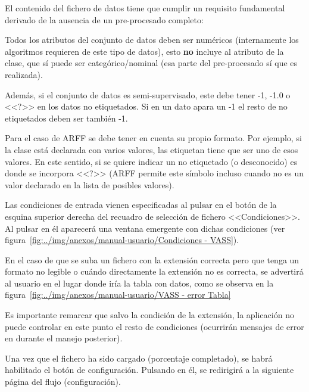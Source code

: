 El contenido del fichero de datos tiene que cumplir un requisito fundamental
derivado de la ausencia de un pre-procesado completo: 

\begin{tcolorbox}[colback=red!5!white,colframe=red!75!black,fontupper=\footnotesize,title=Requisito fundamental]
	Todos los atributos del conjunto de datos deben ser numéricos (internamente los
	algoritmos requieren de este tipo de datos), esto \textbf{no} incluye al
	atributo de la clase, que sí puede ser categórico/nominal (esa parte del
	pre-procesado sí que es realizada).
\end{tcolorbox}

Además, si el conjunto de datos es semi-supervisado, este debe tener -1, -1.0 o
<<?>> en los datos no etiquetados. Si en un dato apara un -1 el resto de no
etiquetados deben ser también -1.

Para el caso de ARFF se debe tener en cuenta su propio formato. Por ejemplo, si
la clase está declarada con varios valores, las etiquetan tiene que ser uno de
esos valores. En este sentido, si se quiere indicar un no etiquetado (o
desconocido) es donde se incorpora <<?>> (ARFF permite este símbolo incluso
cuando no es un valor declarado en la lista de posibles valores).

Las condiciones de entrada vienen especificadas al pulsar en el botón de la
esquina superior derecha del recuadro de selección de fichero <<Condiciones>>.
Al pulsar en él aparecerá una ventana emergente con dichas condiciones (ver
figura~\ref{fig:../img/anexos/manual-usuario/Condiciones - VASS}).


En el caso de que se suba un fichero con la extensión correcta pero que tenga un formato no legible o cuándo directamente la extensión no es correcta, se advertirá al usuario en el lugar donde iría la tabla con datos, como se observa en la figura~\ref{fig:../img/anexos/manual-usuario/VASS - error Tabla}


Es importante remarcar que salvo la condición de la extensión, la aplicación no puede controlar en este punto el resto de condiciones (ocurrirán mensajes de error en durante el manejo posterior).

Una vez que el fichero ha sido cargado (porcentaje completado), se habrá habilitado el botón de configuración. Pulsando en él, se redirigirá a la siguiente página del flujo (configuración).

